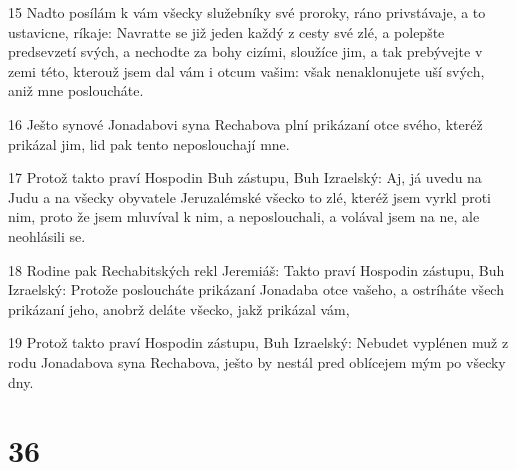 \par 15 Nadto posílám k vám všecky služebníky své proroky, ráno privstávaje, a to ustavicne, ríkaje: Navratte se již jeden každý z cesty své zlé, a polepšte predsevzetí svých, a nechodte za bohy cizími, sloužíce jim, a tak prebývejte v zemi této, kterouž jsem dal vám i otcum vašim: však nenaklonujete uší svých, aniž mne posloucháte.
\par 16 Ješto synové Jonadabovi syna Rechabova plní prikázaní otce svého, kteréž prikázal jim, lid pak tento neposlouchají mne.
\par 17 Protož takto praví Hospodin Buh zástupu, Buh Izraelský: Aj, já uvedu na Judu a na všecky obyvatele Jeruzalémské všecko to zlé, kteréž jsem vyrkl proti nim, proto že jsem mluvíval k nim, a neposlouchali, a volával jsem na ne, ale neohlásili se.
\par 18 Rodine pak Rechabitských rekl Jeremiáš: Takto praví Hospodin zástupu, Buh Izraelský: Protože posloucháte prikázaní Jonadaba otce vašeho, a ostríháte všech prikázaní jeho, anobrž deláte všecko, jakž prikázal vám,
\par 19 Protož takto praví Hospodin zástupu, Buh Izraelský: Nebudet vyplénen muž z rodu Jonadabova syna Rechabova, ješto by nestál pred oblícejem mým po všecky dny.

\chapter{36}


